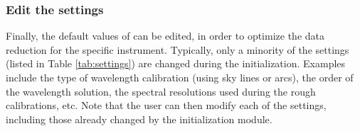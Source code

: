 \documentclass[a4paper]{article}
\begin{document}
\begin{sloppypar}
\subsubsection{Edit the settings}

Finally, the default values of  can be edited, in order to optimize the data reduction for the specific instrument. Typically, only a minority of the settings (listed in Table \ref{tab:settings}) are changed during the initialization. Examples include the type of wavelength calibration (using sky lines or arcs), the order of the wavelength solution, the spectral resolutions used during the rough calibrations, etc. Note that the user can then modify each of the settings, including those already changed by the initialization module.







\end{sloppypar}
\end{document}
